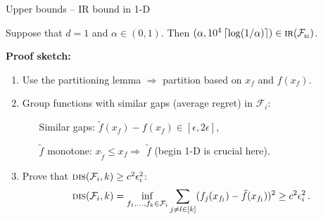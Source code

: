\documentclass{beamer}
\newcommand{\dis}{\operatorname{\textsc{dis}}}
\newcommand{\cF}{\mathcal{F}}
\newcommand{\pb}{\text{\tiny\texttt{b}}}
\newcommand{\pl}{\text{\tiny\texttt{l}}}
\newcommand{\IR}{\operatorname{\textsc{ir}}}
\newcommand{\ceil}[1]{\left\lceil #1 \right\rceil}
\begin{document}

\begin{frame}{Upper bounds -- IR bound in 1-D}
    \small
    \begin{tcolorbox}[title=Theorem 3 -- IR bound for 1-D,colback=blue!5!white,colframe=blue!50!black]
        Suppose that $d = 1$ and $\alpha \in (0,1)$. Then $(\alpha, 10^4 \ceil{\log(1/\alpha)}) \in \IR(\cF_{\pb\pl})$.
    \end{tcolorbox}
    \textbf{Proof sketch:}
    \begin{enumerate}
        \item Use the partitioning lemma $\Rightarrow$ partition  based on $x_f$ and $f(x_f)$.
        \item Group functions with similar gaps (average regret) in $\cF_i$:
              \begin{enumerate}
                  \leftskip=4em %
                  \item[Similar gaps:] $\tilde{f}(x_f) - f(x_f) \in [\epsilon, 2\epsilon]$,
                  \item[$\tilde{f}$ monotone:] $x_{\tilde{f}} \leq x_f \Rightarrow $ $\tilde{f}$ (begin 1-D is crucial here).
              \end{enumerate}
        \item Prove that $\dis(\cF_i, k) \geq c^2\epsilon_i^2$:
              \[
                  \dis(\cF_i, k) = \inf_{f_1,\ldots,f_k \in \cF_i} \sum_{j\neq l \in [k]} (f_j(x_{f_l}) - \tilde f(x_{f_l}))^2 \geq c^2\epsilon_i^2\,.
              \]
    \end{enumerate}
\end{frame}
\end{document}
